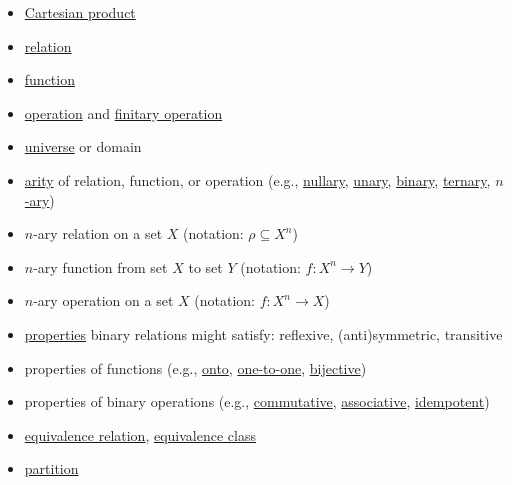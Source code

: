 \documentclass[12pt]{article}
\newcommand{\boldemph}[1]{#1}
\newcommand\<{\ensuremath{\langle}}
\renewcommand\>{\ensuremath{\rangle}}
\begin{document}
\begin{itemize}
\item \href{http://en.wikipedia.org/wiki/Cartesian_product}{Cartesian product}
\item \href{http://en.wikipedia.org/wiki/Finitary_relation}{relation}
\item \href{http://en.wikipedia.org/wiki/Function_(mathematics)}{function}
\item \href{http://en.wikipedia.org/wiki/Operation_(mathematics)}{operation} and 
  \href{http://en.wikipedia.org/wiki/Finitary}{finitary operation}
\item \href{http://en.wikipedia.org/wiki/Structure_(mathematical_logic)#Domain}{universe} or domain
\item \href{http://en.wikipedia.org/wiki/Arity}{arity} of relation, function, or operation 
  (e.g., 
  \href{http://en.wikipedia.org/wiki/Arity#Nullary}{nullary}, 
  \href{http://en.wikipedia.org/wiki/Arity#Unary}{unary}, 
  \href{http://en.wikipedia.org/wiki/Arity#Binary}{binary}, 
  \href{http://en.wikipedia.org/wiki/Arity#Ternary}{ternary},
  \href{http://en.wikipedia.org/wiki/Arity#n-ary}{$n$-ary})
\item $n$-ary relation on a set $X$ (notation: $\rho \subseteq X^n$)
\item $n$-ary function from set $X$ to set $Y$ (notation: $f: X^n \rightarrow Y$)
\item $n$-ary operation on a set $X$ (notation: $f: X^n \rightarrow X$)
\item \href{http://en.wikipedia.org/wiki/Binary_relation#Relations_over_a_set}{properties} binary relations might satisfy: \boldemph{reflexive},
  \boldemph{(anti)symmetric}, \boldemph{transitive}
\item properties of functions (e.g., 
\href{http://en.wikipedia.org/wiki/Surjective_function}{onto}, 
\href{http://en.wikipedia.org/wiki/Injective_function}{one-to-one}, 
\href{http://en.wikipedia.org/wiki/Bijection}{bijective})
\item properties of binary operations 
(e.g., \href{http://en.wikipedia.org/wiki/Commutative_property}{commutative}, 
  \href{http://en.wikipedia.org/wiki/Associative_property}{associative}, 
  \href{http://en.wikipedia.org/wiki/Idempotence}{idempotent})
\item \href{http://en.wikipedia.org/wiki/Equivalence_relation}{equivalence relation},
\href{http://en.wikipedia.org/wiki/Equivalence_class}{equivalence class}
\item \href{http://en.wikipedia.org/wiki/Partition_of_a_set}{partition}

\end{itemize}
\end{document}
